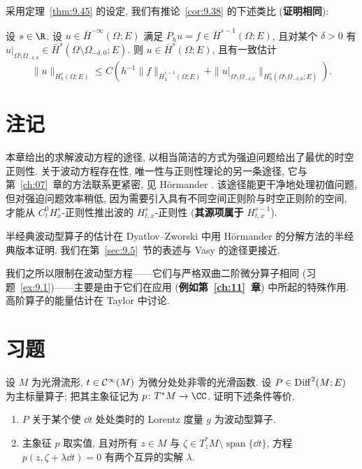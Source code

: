 采用定理~\ref{thm:9.45} 的设定, 我们有推论~\ref{cor:9.38} 的下述类比 (\textbf{证明相同}):

\begin{corollary}[半经典延拓估计]\label{cor:9.46}
设 $s \in \R$. 设 $u \in \bar{H}^{-\infty}(\Omega; E)$ 满足 $P_h u = f \in \bar{H}^{s-1}(\Omega; E)$, 且对某个 $\delta > 0$ 有 $u|_{\Omega \setminus \Omega_{-\delta,0}} \in \bar{H}^s(\Omega \setminus \Omega_{-\delta,0}; E)$. 则 $u \in \bar{H}^s(\Omega; E)$, 且有一致估计
\begin{equation}\label{eq:9.154}
    \|u\|_{H_h^s(\Omega; E)} \le C \left( h^{-1} \|f\|_{\bar{H}_h^{s-1}(\Omega; E)} + \|u|_{\Omega \setminus \Omega_{-\delta,0}}\|_{H_h^s(\Omega \setminus \Omega_{-\delta,0}; E)} \right).
\end{equation}
\end{corollary}

\section*{注记}

本章给出的求解波动方程的途径, 以相当简洁的方式为强迫问题给出了最优的时空正则性. 关于波动方程存在性, 唯一性与正则性理论的另一条途径, 它与第~\ref{ch:07}~章的方法联系更紧密, 见 Hörmander \cite[第 XXIII 章]{Hor07}. 该途径能更干净地处理初值问题, 但对强迫问题效率稍低, 因为需要引入具有不同空间正则阶与时空正则阶的空间, 才能从 $C_t^0 H_x^s$-正则性推出波的 $H_{t,x}^s$-正则性 (\textbf{其源项属于} $H_{t,x}^{s-1}$).

半经典波动型算子的估计在 Dyatlov--Zworski \cite[附录 E.4]{DZ19} 中用 Hörmander \cite[第 XXIII 章]{Hor07} 的分解方法的半经典版本证明. 我们在第~\ref{sec:9.5}~节的表述与 Vasy \cite[\S 3.3]{Vas13} 的途径更接近.

我们之所以限制在波动型方程——它们与严格双曲二阶微分算子相同 (习题~\ref{ex:9.1})——主要是由于它们在应用 (\textbf{例如第~\ref{ch:11}~章}) 中所起的特殊作用. 高阶算子的能量估计在 Taylor \cite[第 2.8 章]{Tay11a} 中讨论.

\section*{习题}

\begin{exer}[波动型算子与严格双曲性]\label{ex:9.1}
设 $M$ 为光滑流形, $t \in \mathcal{C}^\infty(M)$ 为微分处处非零的光滑函数. 设 $P \in \operatorname{Diff}^2(M; E)$ 为主标量算子; 把其主象征记为 $p \colon T^* M \to \CC$. 证明下述条件等价.
\begin{enumerate}[label=(\arabic*)]
    \item $P$ 关于某个使 $\dd t$ 处处类时的 Lorentz 度量 $g$ 为波动型算子.
    \item 主象征 $p$ 取实值, 且对所有 $z \in M$ 与 $\zeta \in T_z^* M \setminus \operatorname{span}\{\dd t\}$, 方程 $p(z, \zeta + \lambda \dd t) = 0$ 有两个互异的实解 $\lambda$.
\end{enumerate}
\end{exer}

